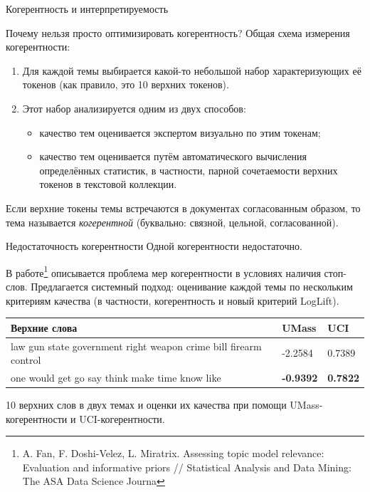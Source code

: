 \begin{frame}{Когерентность и интерпретируемость}

Почему нельзя просто оптимизировать когерентность? Общая схема измерения когерентности:

\begin{enumerate}
    \item Для каждой темы выбирается какой-то небольшой набор характеризующих её токенов (как правило, это 10 верхних токенов).
    \item{Этот набор анализируется одним из двух способов:
    \begin{itemize}
        \item качество тем оценивается экспертом визуально по этим токенам;
        \item качество тем оценивается путём автоматического вычисления определённых статистик, в частности, парной сочетаемости верхних токенов в текстовой коллекции.
    \end{itemize}
    }
\end{enumerate}

Если верхние токены темы встречаются в документах согласованным образом,  то тема называется \textit{когерентной} (буквально: связной, цельной, согласованной).
\end{frame}

\begin{frame}{Недостаточность когерентности}
Одной когерентности недостаточно.

В работе\footnote{A. Fan, F. Doshi-Velez, L. Miratrix. Assessing topic model relevance: Evaluation and informative priors // Statistical Analysis and Data Mining: The ASA Data Science Journa} описывается проблема мер когерентности в условиях наличия стоп-слов. Предлагается системный подход: оценивание каждой темы по нескольким критериям качества (в частности, когерентность и новый критерий LogLift).

\smallskip
\begin{table}[ht]
    \small\centering
    \begin{tabularx}{0.8\textwidth}{|X|l|l|}
    \hline
    Верхние слова &  UMass & UCI
    \\ \hline	
law gun state government right weapon crime bill firearm control &
-2.2584 & 0.7389
    \\ \hline
one would get go say think make time know like & \textbf{-0.9392} & \textbf{0.7822}
    \\ \hline
    \end{tabularx}
\end{table}
10 верхних слов в двух темах и оценки их качества при помощи UMass-когерентности и UCI-когерентности.


\end{frame}

